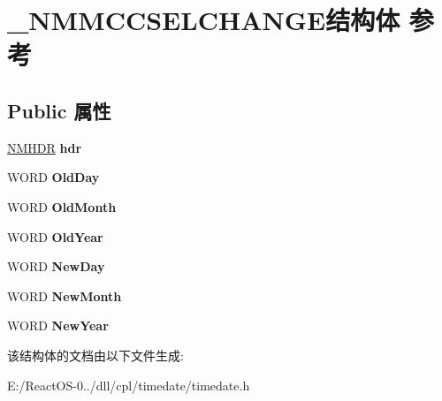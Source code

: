 \hypertarget{struct___n_m_m_c_c_s_e_l_c_h_a_n_g_e}{}\section{\+\_\+\+N\+M\+M\+C\+C\+S\+E\+L\+C\+H\+A\+N\+G\+E结构体 参考}
\label{struct___n_m_m_c_c_s_e_l_c_h_a_n_g_e}
\subsection*{Public 属性}
\begin{DoxyCompactItemize}
\item 
\mbox{\label{struct___n_m_m_c_c_s_e_l_c_h_a_n_g_e_acc8a9f14716ccdfcefdf89d5ff668760}} 
\hyperlink{structtag_n_m_h_d_r}{N\+M\+H\+DR} {\bfseries hdr}
\item 
\mbox{\label{struct___n_m_m_c_c_s_e_l_c_h_a_n_g_e_ad14f98ea651dbfc13b5ae892f4ab06ef}} 
W\+O\+RD {\bfseries Old\+Day}
\item 
\mbox{\label{struct___n_m_m_c_c_s_e_l_c_h_a_n_g_e_a5147e5fbc72b624b9387cacf5ed153bb}} 
W\+O\+RD {\bfseries Old\+Month}
\item 
\mbox{\label{struct___n_m_m_c_c_s_e_l_c_h_a_n_g_e_a146075905bab9e52c0fdc42144ac91d5}} 
W\+O\+RD {\bfseries Old\+Year}
\item 
\mbox{\label{struct___n_m_m_c_c_s_e_l_c_h_a_n_g_e_a997a164cf579356831a7f5865f271f84}} 
W\+O\+RD {\bfseries New\+Day}
\item 
\mbox{\label{struct___n_m_m_c_c_s_e_l_c_h_a_n_g_e_a2c58993065c8aa1f66a8f36be5fee850}} 
W\+O\+RD {\bfseries New\+Month}
\item 
\mbox{\label{struct___n_m_m_c_c_s_e_l_c_h_a_n_g_e_a606885f550443a7194773227107a9f8b}} 
W\+O\+RD {\bfseries New\+Year}
\end{DoxyCompactItemize}


该结构体的文档由以下文件生成\+:\begin{DoxyCompactItemize}
\item 
E\+:/\+React\+O\+S-\/0../dll/cpl/timedate/timedate.\+h\end{DoxyCompactItemize}
